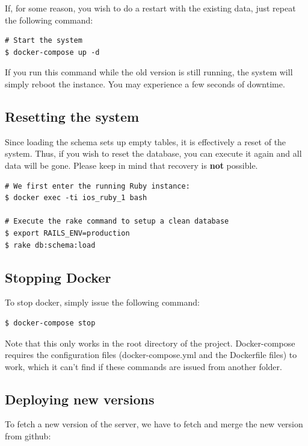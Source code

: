 If, for some reason, you wish to do a restart with the existing data, just repeat the following command:

\begin{verbatim}
# Start the system
$ docker-compose up -d
\end{verbatim}

If you run this command while the old version is still running, the system will simply reboot the instance. You may experience a few seconds of downtime.

\subsection{Resetting the system}
Since loading the schema sets up empty tables, it is effectively a reset of the system. Thus, if you wish to reset the database, you can execute it again and all data will be gone. Please keep in mind that recovery is {\bf not} possible.

\begin{verbatim}
# We first enter the running Ruby instance:
$ docker exec -ti ios_ruby_1 bash

# Execute the rake command to setup a clean database
$ export RAILS_ENV=production
$ rake db:schema:load
\end{verbatim}

\subsection{Stopping Docker}
To stop docker, simply issue the following command:

\begin{verbatim}
$ docker-compose stop
\end{verbatim}

Note that this only works in the root directory of the project. Docker-compose requires the configuration files (docker-compose.yml and the Dockerfile files) to work, which it can't find if these commands are issued from another folder.

\subsection{Deploying new versions}
To fetch a new version of the server, we have to fetch and merge the new version from github:

